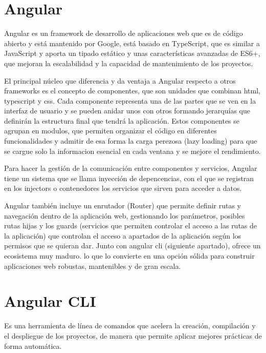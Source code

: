 
\section{Angular}\label{angular}
Angular es un framework de desarrollo de aplicaciones web que es de código abierto y está mantenido por Google, está basado en TypeScript, que es similar a JavaScript y aporta un tipado estático y unas características avanzadas de ES6+, que mejoran la escalabilidad y la capacidad de mantenimiento de los proyectos. 


El principal núcleo que diferencia y da ventaja a Angular respecto a otros frameworks es el concepto de componentes, que son unidades que combinan html, typescript y css. Cada componente representa una de las partes que se ven en la interfaz de usuario y se pueden anidar unos con otros formando jerarquías que definirán la estructura final que tendrá la aplicación. Estos componentes se agrupan en modulos, que permiten organizar el código en diferentes funcionalidades y admitir de esa forma la carga perezosa (lazy loading) para que se cargue solo la informacion esencial en cada ventana y se mejore el rendimiento.

Para hacer la gestión de la comunicación entre componentes y servicios, Angular tiene un sistema que se llama inyección de depencencias, con el que se registran en los injectors o contenedores los servicios que sirven para acceder a datos.

Angular también incluye un enrutador (Router) que permite definir rutas y navegación dentro de la aplicación web, gestionando los parámetros, posibles rutas hijas y los guards (servicios que permiten controlar el acceso a las rutas de la aplicación) que controlan el acceso a apartados de la aplicación según los permisos que se quieran dar. Junto con angular cli (siguiente apartado), ofrece un ecosistema muy maduro. lo que lo convierte en una opción sólida para construir aplicaciones web robustas, mantenibles y de gran escala.

\section{Angular CLI}\label{angular-cli}
Es una herramienta de línea de comandos que acelera la creación, compilación y el despliegue de los proyectos, de manera que permite aplicar mejores prácticas de forma automática.

